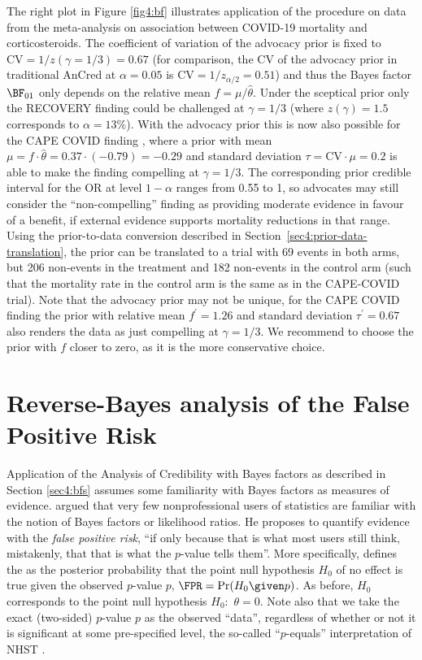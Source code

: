 The right plot in Figure \ref{fig4:bf} illustrates application of the procedure
on data from the meta-analysis on association between COVID-19 mortality and
corticosteroids. The coefficient of variation of the advocacy prior is fixed to
$\text{CV} = 1/z(\gamma=1/3) = 0.67$ (for comparison, the CV of the advocacy
prior in traditional AnCred at $\alpha = 0.05$ is
$\text{CV} = 1/z_{\alpha/2}= 0.51$) and thus the Bayes factor $\BF_{01}$ only
depends on the relative mean $f = \mu/\hat{\theta}$. Under the sceptical prior
only the RECOVERY finding could be challenged at $\gamma = 1/3$ (where
$z(\gamma)=1.5$ corresponds to $\alpha=13$\%). With the advocacy prior this is
now also possible for the CAPE COVID finding \citep{Dequin2020}, where a prior
with mean $\mu = f \cdot \hat{\theta} = 0.37 \cdot (-0.79) = -0.29$ and standard
deviation $\tau = \text{CV} \cdot \mu = 0.2$ is able to make the finding
compelling at $\gamma = 1/3$. The corresponding prior credible interval for the
OR at level $1-\alpha$ ranges from 0.55 to 1, so advocates may still consider
the ``non-compelling'' finding as providing moderate evidence in favour of a
benefit, if external evidence supports mortality reductions in that range. Using
the prior-to-data conversion described in
Section~\ref{sec4:prior-data-translation}, the prior can be translated to a
trial with 69 events in both arms, but 206 non-events in the treatment and 182
non-events in the control arm (such that the mortality rate in the control arm
is the same as in the CAPE-COVID trial). Note that the advocacy prior may not be
unique, \eg for the CAPE COVID finding the prior with relative mean
$f^\prime = 1.26$ and standard deviation $\tau^\prime = 0.67$ also renders the
data as just compelling at $\gamma = 1/3$. We recommend to choose the prior with
$f$ closer to zero, as it is the more conservative choice.

\section{Reverse-Bayes analysis of the False Positive Risk}
\label{sec4:p.equals}

Application of the Analysis of Credibility with Bayes factors as described in
Section \ref{sec4:bfs} assumes some familiarity with Bayes factors as measures
of evidence. \citet{Colquhoun2019} argued that very few nonprofessional users of
statistics are familiar with the notion of Bayes factors or likelihood ratios.
He proposes to quantify evidence with the \emph{false positive risk}, ``if only
because that is what most users still think, mistakenly, that that is what the
$p$-value tells them''. More specifically, \citet{Colquhoun2019} defines the
\FPR{} as the posterior probability that the point null hypothesis $H_0$ of no
effect is true given the observed $p$-value $p$, \ie $\FPR = \Pr(H_0 \given p)$.
As before, $H_0$ corresponds to the point null hypothesis $H_0\colon$
$\theta = 0$. Note also that we take the exact (two-sided) $p$-value $p$ as the
observed ``data'', regardless of whether or not it is significant at some
pre-specified level, the so-called ``$p$-equals'' interpretation of NHST
\citep{Colquhoun2017}.


